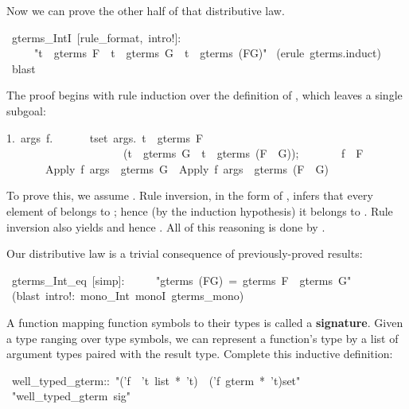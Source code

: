 Now we can prove the other half of that distributive law.
\begin{isabelle}
\ gterms_IntI\ [rule_format,\ intro!]:\isanewline
\ \ \ \ \ "t\ \isasymin \ gterms\ F\ \isasymLongrightarrow \ t\ \isasymin \ gterms\ G\ \isasymlongrightarrow \ t\ \isasymin \ gterms\ (F\isasyminter G)"\isanewline
{}\ (erule\ gterms.induct)\isanewline
{}\ blast\isanewline
{}
\end{isabelle}
%
The proof begins with rule induction over the definition of
, which leaves a single subgoal:  
\begin{isabelle}
1.\ \isasymAnd args\ f.\isanewline
\ \ \ \ \ \ \isasymlbrakk \isasymforall t\isasymin set\ args.\ t\ \isasymin \ gterms\ F\ \isasymand\isanewline
\ \ \ \ \ \ \ \ \ \ \ \ \ \ \ \ \ \ \ \ \ (t\ \isasymin \ gterms\ G\ \isasymlongrightarrow \ t\ \isasymin \ gterms\ (F\ \isasyminter \ G));\isanewline
\ \ \ \ \ \ \ f\ \isasymin \ F\isasymrbrakk \isanewline
\ \ \ \ \ \ \isasymLongrightarrow \ Apply\ f\ args\ \isasymin \ gterms\ G\ \isasymlongrightarrow \ Apply\ f\ args\ \isasymin \ gterms\ (F\ \isasyminter \ G)
\end{isabelle}
%
To prove this, we assume .  Rule inversion, in the form of , infers
that every element of \isa{args} belongs to 
; hence (by the induction hypothesis) it belongs
to .  Rule inversion also yields
\isa{f\ \isasymin\ G} and hence . 
All of this reasoning is done by \isa{blast}.

\smallskip
Our distributive law is a trivial consequence of previously-proved results:
\begin{isabelle}
\ gterms_Int_eq\ [simp]:\isanewline
\ \ \ \ \ "gterms\ (F\isasyminter G)\ =\ gterms\ F\ \isasyminter \ gterms\ G"\isanewline
\isacommand{by}\ (blast\ intro!:\ mono_Int\ monoI\ gterms_mono)
\end{isabelle}


\begin{exercise}
A function mapping function symbols to their 
types is called a \textbf{signature}.  Given a type 
ranging over type symbols, we can represent a function's type by a
list of argument types paired with the result type. 
Complete this inductive definition:
\begin{isabelle}
\ well_typed_gterm::\ "('f\ \isasymRightarrow \ 't\ list\ *\ 't)\ \isasymRightarrow \ ('f\ gterm\ *\ 't)set"\isanewline
\isacommand{inductive}\ "well_typed_gterm\ sig"\isanewline
\end{isabelle}
\end{exercise}
